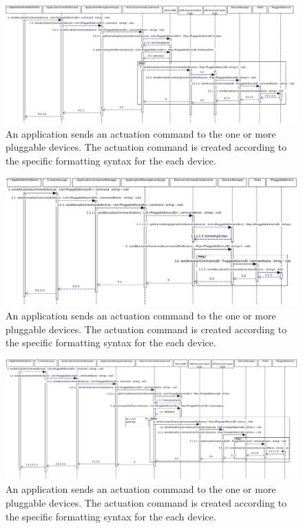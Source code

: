     \begin{figure}[!htp]
    	\centering
    	\includegraphics[width=\textwidth]{images/sequence-UC12-commandFromFrontEnd}
    	\caption[Applications issuing actuation commands]{An application sends an actuation command to the one or more pluggable devices. The actuation command is
    	 created according to the specific formatting syntax for the each device. }\label{fig:seq_scenario31}
    \end{figure}

    \begin{figure}[!htp]
    	\centering
    	\includegraphics[width=\textwidth]{images/sequence-UC12-commandFromGW}
    	\caption[Applications issuing actuation commands]{An application sends an actuation command to the one or more pluggable devices. The actuation command is
    	 created according to the specific formatting syntax for the each device. }\label{fig:seq_scenario32}
    \end{figure}

    \begin{figure}[!htp]
    	\centering
    	\includegraphics[width=\textwidth]{images/sequence-UC12-commandFromOS}
    	\caption[Applications issuing actuation commands]{An application sends an actuation command to the one or more pluggable devices. The actuation command is
    	 created according to the specific formatting syntax for the each device. }\label{fig:seq_scenario33}
    \end{figure}

